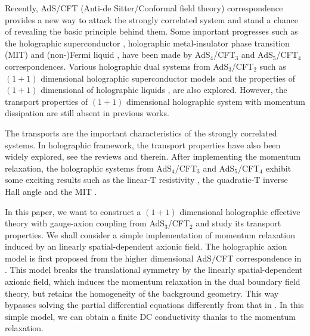 \documentclass[preprint,onecolumn,nofootinbib]{revtex4}
\begin{document}
Recently, AdS/CFT (Anti-de Sitter/Conformal field theory) correspondence \cite{Maldacena:1997re,Gubser:1998bc,Witten:1998qj,Aharony:1999ti} provides a new way to attack the strongly correlated system and stand a chance of revealing the basic principle behind them. Some important progresses such as the holographic superconductor \cite{Hartnoll:2008vx}, holographic metal-insulator phase transition (MIT) \cite{Donos:2012js,Ling:2014saa,An:2020tkn} and (non-)Fermi liquid \cite{Liu:2009dm}, have been made by AdS$_4$/CFT$_3$ and AdS$_5$/CFT$_4$ correspondences. Various holographic dual systems from AdS$_3$/CFT$_2$ such as $(1+1)$ dimensional holographic superconductor models \cite{Ren:2010ha,Liu:2011fy,Li:2012zzb,Alkac:2016otd} and the properties of $(1+1)$ dimensional of holographic liquids \cite{Maity:2009zz,Faulkner:2012gt}, are also explored. However, the transport properties of $(1+1)$ dimensional holographic system with momentum dissipation are still absent in previous works.

The transports are the important characteristics of the strongly correlated systems. In holographic framework, the transport properties have also been widely explored, see the reviews \cite{Hartnoll:2009sz,Natsuume:2014sfa,Hartnoll:2016apf,Baggioli:2019rrs,Baggioli:2021xuv} and therein. After implementing the momentum relaxation, the holographic systems from AdS$_4$/CFT$_3$ and AdS$_5$/CFT$_4$ exhibit some exciting results such as the linear-T resistivity \cite{Hartnoll:2009ns,Davison:2013txa}, the quadratic-T inverse Hall angle \cite{Anderson,coleman1996should,Zhou:2015dha} and the MIT \cite{Mott:1968nwb,Ling:2016dck,Nishioka:2009zj}.

In this paper, we want to construct a $(1+1)$ dimensional holographic effective theory with gauge-axion coupling from AdS$_3$/CFT$_2$ and study its transport properties. We shall consider a simple implementation of momentum relaxation induced by an linearly spatial-dependent axionic field. The holographic axion model is first proposed from the higher dimensional AdS/CFT correspondence in \cite{Andrade:2013gsa}. This model breaks the translational symmetry by the linearly spatial-dependent axionic field, which induces the momentum relaxation in the dual boundary field theory, but retains the homogeneity of the background geometry. This way bypasses solving the partial differential equations differently from that in \cite{Horowitz:2012gs,Horowitz:2012ky,Horowitz:2013jaa}. In this simple model, we can obtain a finite DC conductivity thanks to the momentum relaxation.
\end{document}
